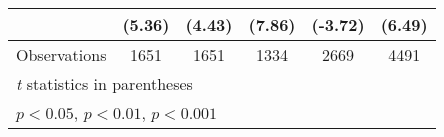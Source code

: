 \begin{table}[htbp]
\begin{tabular}{l*{5}{c}}
                                        &    (5.36)         &    (4.43)         &    (7.86)         &   (-3.72)         &    (6.49)         \\
\midrule
Observations                            &      1651         &      1651         &      1334         &      2669         &      4491         \\
\bottomrule
\multicolumn{6}{l}{\footnotesize \textit{t} statistics in parentheses}\\
\multicolumn{6}{l}{\footnotesize \sym{*} \(p<0.05\), \sym{**} \(p<0.01\), \sym{***} \(p<0.001\)}\\
\end{tabular}
\end{table}
